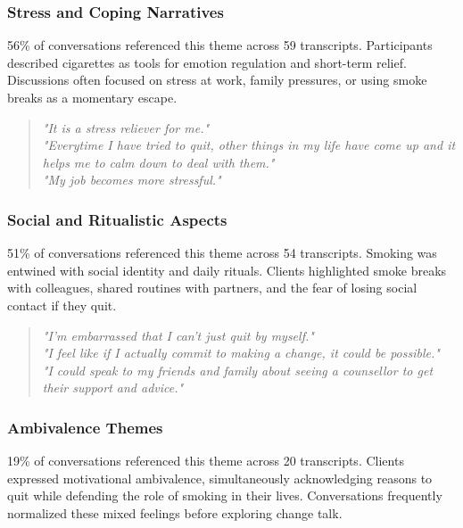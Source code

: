 \subsubsection*{Stress and Coping Narratives}

56\% of conversations referenced this theme across 59 transcripts.
Participants described cigarettes as tools for emotion regulation and short-term relief. Discussions often focused on stress at work, family pressures, or using smoke breaks as a momentary escape.

\begin{quote}
\emph{"It is a stress reliever for me."} \\
\emph{"Everytime I have tried to quit, other things in my life have come up and it helps me to calm down to deal with them."} \\
\emph{"My job becomes more stressful."}
\end{quote}

\subsubsection*{Social and Ritualistic Aspects}

51\% of conversations referenced this theme across 54 transcripts.
Smoking was entwined with social identity and daily rituals. Clients highlighted smoke breaks with colleagues, shared routines with partners, and the fear of losing social contact if they quit.

\begin{quote}
\emph{"I'm embarrassed that I can't just quit by myself."} \\
\emph{"I feel like if I actually commit to making a change, it could be possible."} \\
\emph{"I could speak to my friends and family about seeing a counsellor to get their support and advice."}
\end{quote}

\subsubsection*{Ambivalence Themes}

19\% of conversations referenced this theme across 20 transcripts.
Clients expressed motivational ambivalence, simultaneously acknowledging reasons to quit while defending the role of smoking in their lives. Conversations frequently normalized these mixed feelings before exploring change talk.


